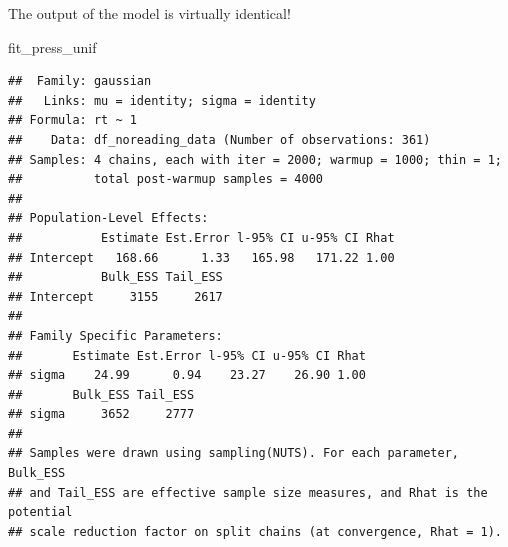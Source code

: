 \documentclass[12pt,ignorenonframetext,aspectratio=169]{beamer}
\newenvironment{Shaded}{\begin{snugshade}}{\end{snugshade}}
\newcommand{\NormalTok}[1]{#1}
\begin{document}
\begin{frame}[fragile]

The output of the model is virtually identical!

\scriptsize

\begin{Shaded}
\begin{Highlighting}[]
\NormalTok{fit_press_unif}
\end{Highlighting}
\end{Shaded}

\begin{verbatim}
##  Family: gaussian 
##   Links: mu = identity; sigma = identity 
## Formula: rt ~ 1 
##    Data: df_noreading_data (Number of observations: 361) 
## Samples: 4 chains, each with iter = 2000; warmup = 1000; thin = 1;
##          total post-warmup samples = 4000
## 
## Population-Level Effects: 
##           Estimate Est.Error l-95% CI u-95% CI Rhat
## Intercept   168.66      1.33   165.98   171.22 1.00
##           Bulk_ESS Tail_ESS
## Intercept     3155     2617
## 
## Family Specific Parameters: 
##       Estimate Est.Error l-95% CI u-95% CI Rhat
## sigma    24.99      0.94    23.27    26.90 1.00
##       Bulk_ESS Tail_ESS
## sigma     3652     2777
## 
## Samples were drawn using sampling(NUTS). For each parameter, Bulk_ESS
## and Tail_ESS are effective sample size measures, and Rhat is the potential
## scale reduction factor on split chains (at convergence, Rhat = 1).
\end{verbatim}

\normalsize

\end{frame}
\end{document}
